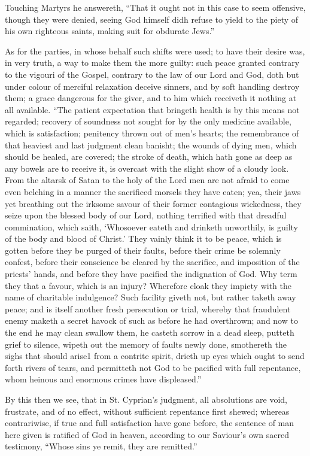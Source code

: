 Touching Martyrs he answereth, “That it ought not in this case to seem offensive, though they were denied, seeing God himself didh refuse to yield to the piety of his own righteous saints, making suit for obdurate Jews.”

As for the parties, in whose behalf such shifts were used; to have their desire was, in very truth, a way to make them the more guilty: such peace granted contrary to the vigouri of the Gospel, contrary to the law of our Lord and God, doth but under colour of merciful relaxation deceive sinners, and by soft handling destroy them; a grace dangerous for the giver, and to him which receiveth it nothing at all available. “The patient expectation that bringeth health is by this means not regarded; recovery of soundness not sought for  by the only medicine available, which is satisfaction; penitency thrown out of men’s hearts; the remembrance of that heaviest and last judgment clean banisht; the wounds of dying men, which should be healed, are covered; the stroke of death, which hath gone as deep as any bowels are to receive it, is overcast with the slight show of a cloudy look. From the altarsk of Satan to the holy of the Lord men are not afraid to come even belching in a manner the sacrificed morsels they have eaten; yea, their jaws yet breathing out the irksome savour of their former contagious wickedness, they seize upon the blessed body of our Lord, nothing terrified with that dreadful commination, which saith, ‘Whosoever eateth and drinketh unworthily, is guilty of the body and blood of Christ.’ They vainly think it to be peace, which is gotten before they be purged of their faults, before their crime be solemnly confest, before their conscience be cleared by the sacrifice, and imposition of the priests’ hands, and before they have pacified the indignation of God. Why term they that a favour, which is an injury? Wherefore cloak they impiety with the name of charitable indulgence? Such facility giveth not, but rather taketh away peace; and is itself another fresh persecution or trial, whereby that fraudulent enemy maketh a secret havock of such as before he had overthrown; and now to the end he may clean swallow them, he casteth sorrow in a dead sleep, putteth grief to silence, wipeth out the memory of faults newly done, smothereth the sighs that should arise1 from a contrite spirit, drieth up eyes which ought to send forth rivers of tears, and permitteth not God to be pacified with full repentance, whom heinous and enormous crimes have displeased.”

By this then we see, that in St. Cyprian’s judgment, all absolutions are void, frustrate, and of no effect, without sufficient repentance first shewed; whereas contrariwise, if true and full satisfaction have gone before, the sentence of man here given is ratified of God in heaven, according to our Saviour’s own sacred testimony, “Whose sins ye remit, they are remitted.”


